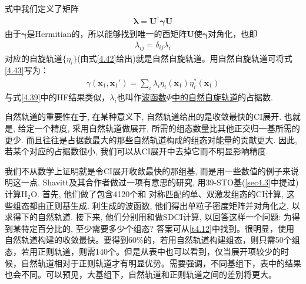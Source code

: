 式中我们定义了矩阵
\begin{align}
\bm{\lambda} = \mathbf{U^\dagger}\bm{\gamma}\mathbf{U}
\end{align}
由于$\bm{\gamma}$是Hermitian的，所以能够找到唯一的酉矩阵$\mathbf{U}$使$\bm{\gamma}$对角化，也即
\begin{align}
\lambda_{ij} = \delta_{ij}\lambda_i
\end{align}
对应的自旋轨道$\{\eta_i\}$(由式\eqref{4.42}给出)就是自然自旋轨道。用自然自旋轨道可将式\eqref{4.43}写为：
\begin{align}
\gamma(\mathbf{x}_1,\mathbf{x}_1') = \sum_i \lambda_i \eta_i(\mathbf{x}_1) \eta_i^*(\mathbf{x}_1)
\end{align}
与式\eqref{4.39}中的HF结果类似，$\lambda_i$也叫作\underline{\underline{波函数$\Phi$}中的\underline{自然自旋轨道}}的占据数.

自然轨道的重要性在于, 在某种意义下, 自然轨道给出的是收敛最快的CI展开. 也就是, 给定一个精度, 采用自然轨道做展开, 所需的组态数量比其他正交归一基所需的更少. 而且往往是占据数最大的那些自然轨道构成的组态对能量的贡献更大. 因此, 若某个对应的占据数很小, 我们可以从CI展开中去掉它而不明显影响精度.

我们不从数学上证明就是令CI展开收敛最快的那组基, 而是用一些数值的例子来说明这一点. Shavitt及其合作者做过一项有意思的研究, 用39-STO基(\ref{sec4.3}中提过)计算$\mathrm{H_2O}$. 首先, 他们做了包含4120个和\mci
{对称匹配}的单、双激发组态的CI计算, 这些组态都由正则\hft 基生成. 利生成的波函数, 他们得出单粒子密度矩阵并对角化之, 以求得下的自然轨道. 接下来, 他们分别用和做SDCI计算, 以回答这样一个问题: 为得到某特定百分比的, 至少需要多少个组态? 答案可从\ref{t4.12}中找到。很明显，使用自然轨道构建的收敛最快。要得到60\%的，若用自然轨道构建组态，则只需50个组态，若用正则轨道，则需140个。但是从表中也可以看到，仅当展开项较少的时候，自然轨道相对于正则轨道才有明显优势。需要强调，不同基组下，表中的结果也会不同。可以预见，大基组下，自然轨道和正则轨道之间的差别将更大。

